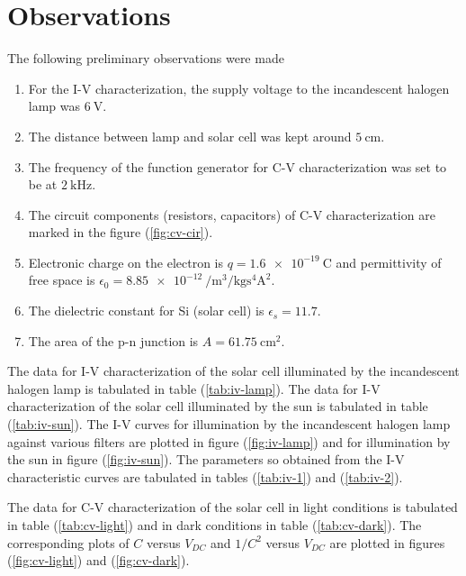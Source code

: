 \documentclass[%
 aip,
 amsmath,amssymb,
 reprint, floatfix%
]{revtex4-2}
\begin{document}
\section{Observations}
    The following preliminary observations were made
    \begin{enumerate}
        \item For the I-V characterization, the supply voltage to the incandescent halogen lamp was $\SI{6}{\volt}$.
        \item The distance between lamp and solar cell was kept around $\SI{5}{\centi \metre}$.
        \item The frequency of the function generator for C-V characterization was set to be at $\SI{2}{\kilo \hertz}$.
        \item The circuit components (resistors, capacitors) of C-V characterization are marked in the figure (\ref{fig:cv-cir}).
        \item  Electronic charge on the electron is $q = \SI{1.6e-19}{\coulomb}$ and permittivity of free space is $\epsilon_0 = \SI{8.85e-12}{\per \metre \cubed \per \kilogram \second\tothe{4} \ampere \squared}$.
        \item The dielectric constant for Si (solar cell) is $\epsilon_s = 11.7$.
        \item The area of the p-n junction is $A = \SI{61.75}{\centi \metre \squared}$.
    \end{enumerate}
    The data for I-V characterization of the solar cell illuminated by the incandescent halogen lamp is tabulated in table (\ref{tab:iv-lamp}). The data for I-V characterization of the solar cell illuminated by the sun is tabulated in table (\ref{tab:iv-sun}). The I-V curves for illumination by the incandescent halogen lamp against various filters are plotted in figure (\ref{fig:iv-lamp}) and for illumination by the sun in figure (\ref{fig:iv-sun}). The parameters so obtained from the I-V characteristic curves are tabulated in tables (\ref{tab:iv-1}) and (\ref{tab:iv-2}).
    \par
    The data for C-V characterization of the solar cell in light conditions is tabulated in table (\ref{tab:cv-light}) and in dark conditions in table (\ref{tab:cv-dark}). The corresponding plots of $C$ versus $V_{DC}$ and $1/C^2$ versus $V_{DC}$ are plotted in figures (\ref{fig:cv-light}) and (\ref{fig:cv-dark}).
\end{document}
